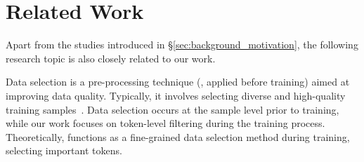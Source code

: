 \section{Related Work} \label{sec:related_work}

Apart from the studies introduced in \S\ref{sec:background_motivation}, the following research topic is also closely related to our work.

 Data selection is a pre-processing technique (\ie, applied before training) aimed at improving data quality. Typically, it involves selecting diverse and high-quality training samples~\cite{DBLP:journals/corr/abs-2410-08102}. Data selection occurs at the sample level prior to training, while our work focuses on token-level filtering during the training process. Theoretically, \solution functions as a fine-grained data selection method during training, selecting important tokens.